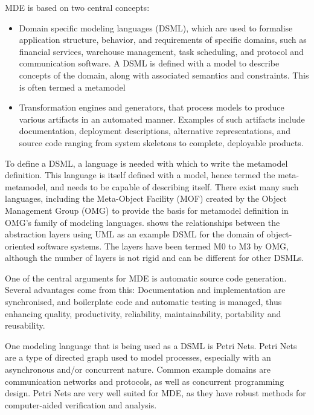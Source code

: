 MDE is based on two central concepts:
\begin{itemize}
	\item Domain specific modeling languages (DSML), which are used to formalise
	application structure, behavior, and requirements of specific domains, such as
	financial services, warehouse management, task scheduling, and protocol and
	communication software. A DSML is defined with a model to describe concepts
	of the domain, along with associated semantics and constraints. This is often
	termed a metamodel
	\item Transformation engines and generators, that process models to produce
	various artifacts in an automated manner. Examples of such
	artifacts include documentation, deployment descriptions, alternative
	representations, and source code ranging from system skeletons to complete,
	deployable products.
\end{itemize}

To define a DSML, a language is needed with which to write the
metamodel definition. This language is itself defined with a model, hence termed
the meta-metamodel, and needs to be capable of describing itself. There exist many such
languages, including the Meta-Object Facility (MOF) \cite{mof} created by the
Object Management Group (OMG) to provide the basis for metamodel definition in
OMG’s family of modeling languages. 
shows the relationships between the abstraction layers using UML as an example
DSML for the domain of object-oriented software systems. The layers have
been termed M0 to M3 by OMG, although the number of layers is not rigid and can
be different for other DSMLs. 


One of the central arguments for MDE is automatic source code generation.
Several advantages come from this:  Documentation and
implementation are synchronised, and boilerplate code and automatic testing is
managed, thus enhancing quality, productivity, reliability, maintainability,
portability and reusability.

One modeling language that is being used as a DSML is Petri Nets. 
Petri Nets are a type of directed graph used to model processes,
especially with an asynchronous and/or concurrent nature. Common
example domains are communication networks and protocols, as
well as concurrent programming design.
Petri Nets are very well suited for MDE, as they have robust methods for
computer-aided verification and analysis. 

